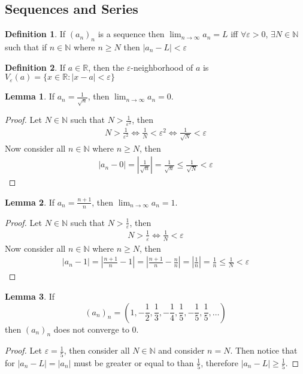 \documentclass[12pt]{article}
\theoremstyle{definition}
\newtheorem{definition}{Definition}
\theoremstyle{definition}
\theoremstyle{definition}
\newtheorem{lemma}{Lemma}
\theoremstyle{definition}
\begin{document}
\begin{flushleft}

\section{Sequences and Series}
\begin{definition}
    If $(a_n)_n$ is a sequence then $\lim_{n\to \infty} a_n = L$ iff $\forall\varepsilon > 0$, $\exists N \in \mathbb{N}$ such that if $n \in \mathbb{N}$ where $n \geq N$ then $|a_n - L| < \varepsilon$
\end{definition}
\begin{definition}
    If $a \in \mathbb{R}$, then the $\varepsilon$-neighborhood of $a$ is $V_\varepsilon(a) = \{ x \in \mathbb{R} : |x - a| < \varepsilon \}$
\end{definition}
\begin{lemma}
    If $a_n = \frac{1}{\sqrt{n}}$, then $\lim_{n\to\infty} a_n = 0$.
\end{lemma}
\begin{proof}
    Let $N \in \mathbb{N}$ such that $N > \frac{1}{\varepsilon^2}$, then
    \begin{align*}
        N > \frac{1}{\varepsilon^2} \iff \frac{1}{N} < \varepsilon^2 \iff \frac{1}{\sqrt{N}} < \varepsilon
    \end{align*}
    Now consider all $n \in \mathbb{N}$ where $n \geq N$, then
    \begin{align*}
        |a_n - 0| = \left|\frac{1}{\sqrt{n}}\right| = \frac{1}{\sqrt{n}} \leq \frac{1}{\sqrt{N}} < \varepsilon
    \end{align*}
\end{proof}
\begin{lemma}
    If $a_n = \frac{n + 1}{n}$, then $\lim_{n\to\infty} a_n = 1$.
\end{lemma}
\begin{proof}
    Let $N \in \mathbb{N}$ such that $N > \frac{1}{\varepsilon}$, then
    \begin{align*}
        N > \frac{1}{\varepsilon} \iff \frac{1}{N} < \varepsilon
    \end{align*}
    Now consider all $n \in \mathbb{N}$ where $n \geq N$, then
    \begin{align*}
        |a_n - 1|
        = \left|\frac{n + 1}{n} - 1\right|
        = \left|\frac{n + 1}{n} - \frac{n}{n}\right|
        = \left|\frac{1}{n}\right|
        = \frac{1}{n}
        \leq \frac{1}{N}
        < \varepsilon
    \end{align*}
\end{proof}
\begin{lemma}
    If \[
        (a_n)_n = \left(1, -\frac{1}{2}, \frac{1}{3}, -\frac{1}{4}, \frac{1}{5}, -\frac{1}{5}, \frac{1}{5}, \ldots\right)
    \]
    then $(a_n)_n$ does not converge to $0$.
\end{lemma}
\begin{proof}
    Let $\varepsilon = \frac{1}{5}$, then consider all $N \in \mathbb{N}$ and consider $n = N$. Then notice that for $|a_n - L| = |a_n|$ must be greater or equal to than $\frac{1}{5}$, therefore $|a_n - L| \geq \frac{1}{5}$.
\end{proof}


\end{flushleft}
\end{document}
